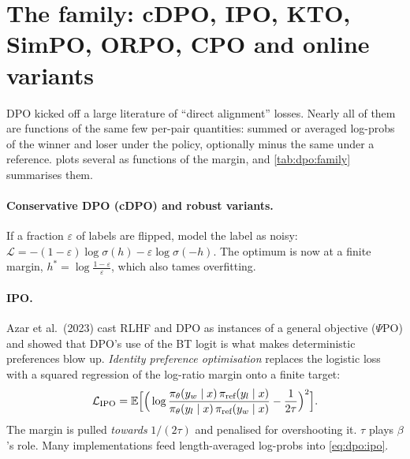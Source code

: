 \section{The family: cDPO, IPO, KTO, SimPO, ORPO, CPO and online variants}\label{sec:dpo:family}

DPO kicked off a large literature of ``direct alignment'' losses. Nearly all of them are
functions of the same few per-pair quantities: summed or averaged log-probs of the winner and
loser under the policy, optionally minus the same under a reference.  plots
several as functions of the margin, and \cref{tab:dpo:family} summarises them.

\paragraph{Conservative DPO (cDPO) and robust variants.} If a fraction $\varepsilon$ of labels are
flipped, model the label as noisy:
$\mathcal{L}=-(1-\varepsilon)\log\sigma(h)-\varepsilon\log\sigma(-h)$. The optimum is now at a finite
margin, $h^*=\log\frac{1-\varepsilon}{\varepsilon}$, which also tames overfitting.

\paragraph{IPO.} Azar et al.\ (2023) cast RLHF and DPO as instances of a general objective
($\Psi$PO) and showed that DPO's use of the BT logit is what makes deterministic preferences
blow up. \emph{Identity preference optimisation} replaces the logistic loss with a squared
regression of the log-ratio margin onto a finite target:
\begin{equation}
\mathcal{L}_{\text{IPO}}=\mathbb{E}\Big[\Big(\log\frac{\pi_\theta(y_w\mid x)\,\pi_{\text{ref}}(y_l\mid x)}
{\pi_\theta(y_l\mid x)\,\pi_{\text{ref}}(y_w\mid x)}-\frac{1}{2\tau}\Big)^2\Big].
\label{eq:dpo:ipo}
\end{equation}
The margin is pulled \emph{towards} $1/(2\tau)$ and penalised for overshooting it. $\tau$ plays
$\beta$'s role. Many implementations feed length-averaged log-probs into \eqref{eq:dpo:ipo}.

